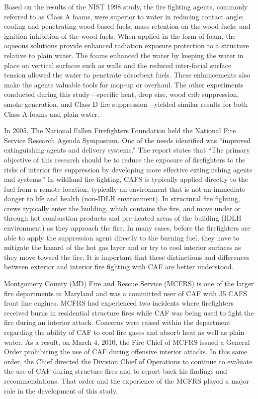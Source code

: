 \documentclass[12pt,oneside]{book}
\begin{document}
Based on the results of the NIST 1998 study, the fire fighting agents, commonly referred to as Class A foams, were superior to water in reducing contact angle; cooling and penetrating wood-based fuels; mass retention on the wood fuels; and ignition inhibition of the wood fuels.  When applied in the form of foam, the aqueous solutions provide enhanced radiation exposure protection to a structure relative to plain water. The foams enhanced the water by keeping the water in place on vertical surfaces such as walls and the reduced inter-facial surface tension allowed the water to penetrate adsorbent fuels. These enhancements also make the agents valuable tools for mop-up or overhaul. The other experiments conducted during this study---specific heat, drop size, wood crib suppression, smoke generation, and Class D fire suppression---yielded similar results for both Class A foams and plain water.

In 2005, The National Fallen Firefighters Foundation held the National Fire Service Research Agenda Symposium.  One of the needs identified was ``improved extinguishing agents and delivery systems.'' The report states that ``The primary objective of this research should be to reduce the exposure of firefighters to the risks of interior fire suppression by developing more effective extinguishing agents and systems.'' In wildland fire fighting, CAFS is typically applied directly to the fuel from a remote location, typically an environment that is not an immediate danger to life and health (non-IDLH environment). In structural fire fighting, crews typically enter the building, which contains the fire, and move under or through hot combustion products and pre-heated areas of the building (IDLH environment) as they approach the fire. In many cases, before the firefighters are able to apply the suppression agent directly to the burning fuel, they have to mitigate the hazard of the hot gas layer and or try to cool interior surfaces as they move toward the fire. It is important that these distinctions and differences between exterior and interior fire fighting with CAF are better understood.

Montgomery County (MD) Fire and Rescue Service (MCFRS) is one of the larger fire departments in Maryland and was a committed user of CAF with 35 CAFS front line engines. MCFRS had experienced two incidents where firefighters received burns in residential structure fires while CAF was being used to fight the fire during an interior attack. Concerns were raised within the department regarding the ability of CAF to cool fire gases and absorb heat as well as plain water. As a result, on March 4, 2010, the Fire Chief of MCFRS issued a General Order prohibiting the use of CAF during offensive interior attacks. In this same order, the Chief directed the Division Chief of Operations to continue to evaluate the use of CAF during structure fires and to report back his findings and recommendations. That order and the experience of the MCFRS played a major role in the development of this study.
\end{document}
